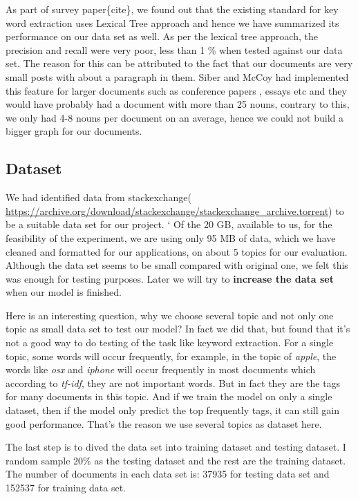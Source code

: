 \documentclass[dvips,9pt]{article}
\begin{document}
				
		As part of survey paper\{cite\}, we found out that the existing standard for key word extraction uses Lexical Tree approach and hence we have summarized its performance on our data set as well. As per the lexical tree approach, the precision and recall were very poor, less than 1 \% when tested against our data set. The reason for this can be attributed to the fact that our documents are very small posts with about a paragraph in them. Siber and McCoy\cite{silber2002efficiently} had implemented this feature for larger documents such as conference papers , essays etc and they would have probably had a document with more than 25 nouns, contrary to this, we only had 4-8 nouns per document on an average, hence we could not build a bigger graph for our documents. 
		
		\subsection{Dataset}
		
		We had identified data from stackexchange( \url{https://archive.org/download/stackexchange/stackexchange_archive.torrent}) to be a suitable data set for our project. 
		`
		Of the 20 GB, available to us, for the feasibility of the experiment, we are using only 95 MB of data, which we have cleaned and formatted for our applications, on about 5 topics for our evaluation. Although the data set seems to be small compared with original one, we felt this was enough for testing purposes. Later we will try to \textbf{increase the data set} when our model is finished.
        
        Here is an interesting question, why we choose several topic and not only one topic as small data set to test our model? In fact we did that, but found that it's not a good way to do testing of the task like keyword extraction. For a single topic, some words will occur frequently, for example, in the topic of \emph{apple}, the words like \emph{osx} and \emph{iphone} will occur frequently in most documents which according to \emph{tf-idf}, they are not important words. But in fact they are the tags for many documents in this topic. And if we train the model on only a single dataset, then if the model only predict the top frequently tags, it can still gain good performance. That's the reason we use several topics as dataset here.
        
        The last step is to dived the data set into training dataset and testing dataset. I random sample 20\% as the testing dataset and the rest are the training dataset. The number of documents in each data set is: 37935 for testing data set and 152537 for training data set.
\end{document}
